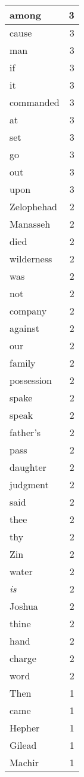 \begin{center}
\begin{longtable}{l|r}
among & 3\\ \hline 
cause & 3\\ \hline 
man & 3\\ \hline 
if & 3\\ \hline 
it & 3\\ \hline 
commanded & 3\\ \hline 
at & 3\\ \hline 
set & 3\\ \hline 
go & 3\\ \hline 
out & 3\\ \hline 
upon & 3\\ \hline 
Zelophehad & 2\\ \hline 
Manasseh & 2\\ \hline 
died & 2\\ \hline 
wilderness & 2\\ \hline 
was & 2\\ \hline 
not & 2\\ \hline 
company & 2\\ \hline 
against & 2\\ \hline 
our & 2\\ \hline 
family & 2\\ \hline 
possession & 2\\ \hline 
spake & 2\\ \hline 
speak & 2\\ \hline 
father's & 2\\ \hline 
pass & 2\\ \hline 
daughter & 2\\ \hline 
judgment & 2\\ \hline 
said & 2\\ \hline 
thee & 2\\ \hline 
thy & 2\\ \hline 
Zin & 2\\ \hline 
water & 2\\ \hline 
\emph{is} & 2\\ \hline 
Joshua & 2\\ \hline 
thine & 2\\ \hline 
hand & 2\\ \hline 
charge & 2\\ \hline 
word & 2\\ \hline 
Then & 1\\ \hline 
came & 1\\ \hline 
Hepher & 1\\ \hline 
Gilead & 1\\ \hline 
Machir & 1\\ \hline 

\end{longtable}
\end{center}
